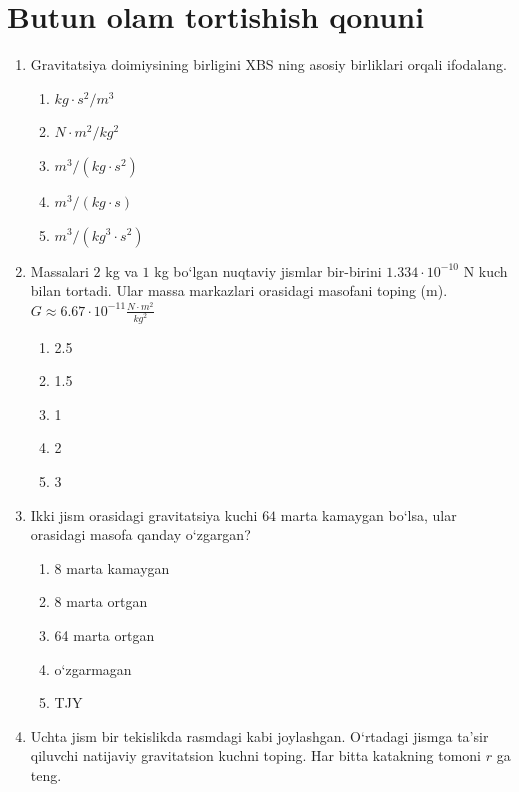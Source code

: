 \section{Butun olam tortishish qonuni}

\begin{enumerate}

\item Gravitatsiya doimiysining birligini XBS ning asosiy birliklari orqali ifodalang.

\begin{enumerate}[label=\Alph*)]
\item $kg\cdot s^2/m^3$
\item $N\cdot m^2/kg^2$
\item $m^3/(kg\cdot s^2)$
\item $m^3/(kg\cdot s)$
\item $m^3/(kg^3\cdot s^2)$
\end{enumerate}

\item Massalari $2$ kg va $1$ kg bo‘lgan nuqtaviy jismlar bir-birini $1.334\cdot10^{-10}$ N kuch bilan tortadi. Ular massa markazlari orasidagi masofani toping (m).$G \approx 6.67\cdot10^{-11}\frac{N\cdot m^2}{kg^2}$

\begin{enumerate}[label=\Alph*)]
\item 2.5
\item 1.5
\item 1
\item 2
\item 3
\end{enumerate}

\item Ikki jism orasidagi gravitatsiya kuchi $64$ marta kamaygan bo‘lsa,
ular orasidagi masofa qanday o‘zgargan?

\begin{enumerate}[label=\Alph*)]
\item 8 marta kamaygan
\item 8 marta ortgan
\item 64 marta ortgan
\item o‘zgarmagan
\item TJY
\end{enumerate}

\item Uchta jism bir tekislikda rasmdagi kabi joylashgan.
O‘rtadagi jismga ta’sir qiluvchi natijaviy gravitatsion kuchni toping.
Har bitta katakning tomoni $r$ ga teng.


\end{enumerate}
